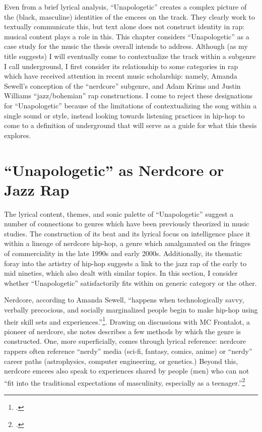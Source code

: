 Even from a brief lyrical analysis, ``Unapologetic'' creates a complex picture of the (black, masculine) identities
of the emcees on the track. They clearly work to textually communicate this, but text alone does not construct identity
in rap: musical content plays a role in this. This chapter considers ``Unapologetic'' as a case study for the music the
thesis overall intends to address. Although (as my title suggests) I will eventually come to contextualize the track
within a subgenre I call underground, I first consider its relationship to some categories in rap which have received
attention in recent music scholarship: namely, Amanda Sewell's conception of the ``nerdcore'' subgenre, and 
Adam Krims and Justin Williams ``jazz/bohemian'' rap constructions. I come to reject these designations for ``Unapologetic''
because of the limitations of contextualizing the song within a single sound or style, instead looking towards listening
practices in hip-hop to come to a definition of underground that will serve as a guide for what this thesis explores.


\section{``Unapologetic'' as Nerdcore or Jazz Rap} \label{unapologeticnerdcorejazz}

The lyrical content, themes, and sonic palette of ``Unapologetic'' suggest a number of connections to genres which
have been previously theorized in music studies. The construction of its beat and its lyrical focus on intelligence
place it within a lineage of nerdcore hip-hop, a genre which amalgamated on the fringes of commerciality in the late
1990s and early 2000s. Additionally, its thematic foray into the artistry of hip-hop suggests a link to the jazz rap 
of the early to mid nineties, which also dealt with similar topics. In this section, I consider whether ``Unapologetic''
satisfactorily fits within on generic category or the other.

Nerdcore, according to Amanda Sewell, ``happens when technologically savvy, verbally precocious, and socially marginalized
people begin to make hip-hop using their skill sets and experiences.''\footnote{
    \autocite[223]{amandasewellNerdcoreHiphop2015}.}. 
Drawing on discussions with MC Frontalot, a pioneer of nerdcore, she notes describes a few methods by which the genre is 
constructed. One, more superficially, comes through lyrical reference: nerdcore rappers often reference ``nerdy'' media 
(sci-fi, fantasy, comics, anime) or ``nerdy'' career paths (astrophysics, computer engineering, or genetics.) Beyond this,
nerdcore emcees also speak to experiences shared by people (men) who can not ``fit into the traditional expectations of 
masculinity, especially as a teenager.''\footnote{
    \autocite[225]{amandasewellNerdcoreHiphop2015}.} 


